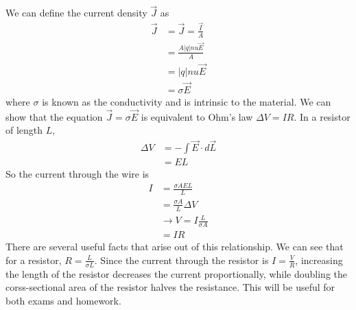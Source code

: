 \documentclass[nobib]{tufte-handout}
\begin{document}
We can define the current 
density $\vec{J}$ as 
\begin{align*}
    \vec{J} &= \vec{J} = \frac{\vec{I}}{A}\\
    &= \frac{A|q|nu\vec{E}}{A} \\
    &= |q|nu\vec{E} \\
    &= \sigma \vec{E}
\end{align*}
where $\sigma$ is known as 
the conductivity and is 
intrinsic to the material. 
We can show that the equation 
$\vec{J} = \sigma \vec{E}$ is 
equivalent to Ohm's law $\Delta V = IR$. 
In a resistor of length $L$, 
\begin{align*}
    \Delta V &= - \int \vec{E} \cdot d\vec{L} \\
    &= EL
\end{align*}
So the current through the wire is 
\begin{align*}
    I &= \frac{\sigma AEL}{L}  \\
    &= \frac{\sigma A}{L}\Delta V\\
    &\rightarrow V = I \frac{L}{\sigma A} \\
    &= IR
\end{align*}
There are several useful facts that 
arise out of this relationship. 
We can see that for 
a resistor,  $R = \frac{L}{\sigma L}$. 
Since the current through the resistor is 
$I = \frac{V}{R}$, increasing the 
length of the resistor decreases the 
current proportionally, while doubling the 
corss-sectional area of the resistor 
halves the resistance. This will be useful 
for both exams and homework. 
\end{document}
